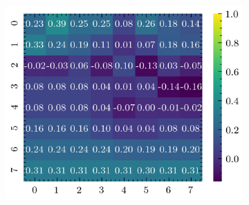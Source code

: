 \documentclass[../document.tex]{subfiles}
\begin{document}
\begin{figure}[H]
\begin{subfigure}[b]{0.19\textwidth}
        \includegraphics[width=\linewidth]{../img/5/quarry/worst/heatmap-2d-4.png}
    \end{subfigure}  


\end{figure}
\end{document}
